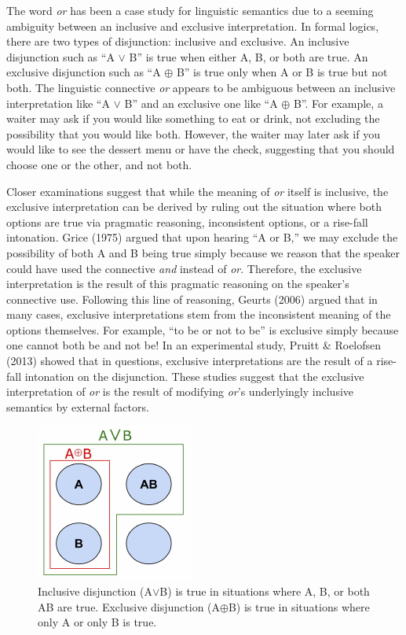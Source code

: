 \documentclass[10pt, letterpaper]{article}
\newenvironment{CodeChunk}{}{}
\begin{document}
The word \emph{or} has been a case study for linguistic semantics due to
a seeming ambiguity between an inclusive and exclusive interpretation.
In formal logics, there are two types of disjunction: inclusive and
exclusive. An inclusive disjunction such as ``A \(\vee\) B'' is true
when either A, B, or both are true. An exclusive disjunction such as ``A
\(\oplus\) B'' is true only when A or B is true but not both. The
linguistic connective \emph{or} appears to be ambiguous between an
inclusive interpretation like ``A \(\vee\) B'' and an exclusive one like
``A \(\oplus\) B''. For example, a waiter may ask if you would like
something to eat or drink, not excluding the possibility that you would
like both. However, the waiter may later ask if you would like to see
the dessert menu or have the check, suggesting that you should choose
one or the other, and not both.

Closer examinations suggest that while the meaning of \emph{or} itself
is inclusive, the exclusive interpretation can be derived by ruling out
the situation where both options are true via pragmatic reasoning,
inconsistent options, or a rise-fall intonation. Grice (1975) argued
that upon hearing ``A or B,'' we may exclude the possibility of both A
and B being true simply because we reason that the speaker could have
used the connective \emph{and} instead of \emph{or}. Therefore, the
exclusive interpretation is the result of this pragmatic reasoning on
the speaker's connective use. Following this line of reasoning, Geurts
(2006) argued that in many cases, exclusive interpretations stem from
the inconsistent meaning of the options themselves. For example, ``to be
or not to be'' is exclusive simply because one cannot both be and not
be! In an experimental study, Pruitt \& Roelofsen (2013) showed that in
questions, exclusive interpretations are the result of a rise-fall
intonation on the disjunction. These studies suggest that the exclusive
interpretation of \emph{or} is the result of modifying \emph{or}'s
underlyingly inclusive semantics by external factors.

\begin{CodeChunk}
\begin{figure}[t]

{\centering \includegraphics{figs/aorb-1} 

}

\caption[Inclusive disjunction (A$\vee$B) is true in situations where A, B, or both AB are true]{Inclusive disjunction (A$\vee$B) is true in situations where A, B, or both AB are true. Exclusive disjunction (A$\oplus$B) is true in situations where only A or only B is true.}\label{fig:aorb}
\end{figure}
\end{CodeChunk}
\end{document}
